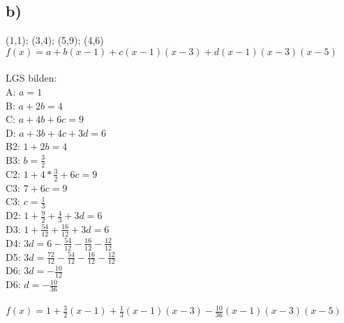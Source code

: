 \documentclass{article}
\begin{document}
	\subsection*{b)}
	(1,1); (3,4); (5,9); (4,6) \\
	$f(x) = a + b(x-1) + c(x-1)(x-3) + d(x-1)(x-3)(x-5)$ \\ \\
	LGS bilden: \\
	A: $a = 1$ \\
	B: $a + 2b  = 4$ \\
	C: $a + 4b + 6c = 9$ \\
	D: $a + 3b + 4c + 3d = 6$ \\
	B2: $1 + 2b  = 4$ \\
	B3: $b  = \frac{3}{2}$ \\
	C2: $1 + 4*\frac{3}{2} + 6c = 9$ \\
	C3: $7 + 6c = 9$ \\
	C3: $c = \frac{1}{3}$ \\
	D2: $1 + \frac{9}{2} + \frac{4}{3} + 3d = 6$ \\
	D3: $1 + \frac{54}{12} + \frac{16}{12} + 3d = 6$ \\
	D4: $3d = 6 - \frac{54}{12} - \frac{16}{12} - \frac{12}{12}$ \\
	D5: $3d = \frac{72}{12} - \frac{54}{12} - \frac{16}{12} - \frac{12}{12}$ \\
	D6: $3d = -\frac{10}{12}$ \\
	D6: $d = -\frac{10}{36}$ \\ \\
	$f(x) = 1 + \frac{3}{2}(x-1) + \frac{1}{3}(x-1)(x-3) - \frac{10}{36}(x-1)(x-3)(x-5)$
\end{document}
